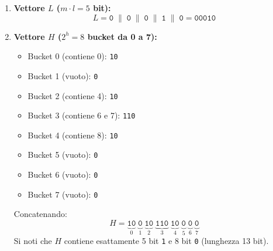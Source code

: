 \begin{enumerate}
  \item \textbf{Vettore $L$ ($m \cdot l = 5$ bit):}
  \begin{equation}
    L = \texttt{0} \;\|\; \texttt{0} \;\|\; \texttt{0} \;\|\; \texttt{1} \;\|\; \texttt{0} = \texttt{00010}
  \end{equation}
  \item \textbf{Vettore $H$ ($2^h = 8$ bucket da 0 a 7):}
  \begin{itemize}
    \item Bucket 0 (contiene 0): \texttt{10}
    \item Bucket 1 (vuoto): \texttt{0}
    \item Bucket 2 (contiene 4): \texttt{10}
    \item Bucket 3 (contiene 6 e 7): \texttt{110}
    \item Bucket 4 (contiene 8): \texttt{10}
    \item Bucket 5 (vuoto): \texttt{0}
    \item Bucket 6 (vuoto): \texttt{0}
    \item Bucket 7 (vuoto): \texttt{0}
  \end{itemize}
  Concatenando:
  \begin{equation}
    H = \underbrace{\texttt{10}}_{0} \; \underbrace{\texttt{0}}_{1} \; \underbrace{\texttt{10}}_{2} \; \underbrace{\texttt{110}}_{3} \; \underbrace{\texttt{10}}_{4} \; \underbrace{\texttt{0}}_{5} \; \underbrace{\texttt{0}}_{6} \; \underbrace{\texttt{0}}_{7}
  \end{equation}
  Si noti che $H$ contiene esattamente 5 bit \texttt{1} e 8 bit \texttt{0} (lunghezza 13 bit).
\end{enumerate}

